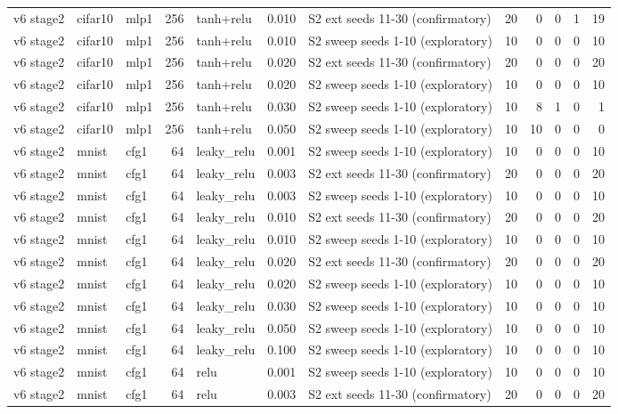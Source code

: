 \begin{table}[htbp]
{\begin{tabular}{@{}lllrlrlrrrrr@{}}
v6 stage2 & cifar10 & mlp1 & 256 & tanh+relu & 0.010 & S2 ext seeds 11-30 (confirmatory) & 20 & 0 & 0 & 1 & 19 \\
v6 stage2 & cifar10 & mlp1 & 256 & tanh+relu & 0.010 & S2 sweep seeds 1-10 (exploratory) & 10 & 0 & 0 & 0 & 10 \\
v6 stage2 & cifar10 & mlp1 & 256 & tanh+relu & 0.020 & S2 ext seeds 11-30 (confirmatory) & 20 & 0 & 0 & 0 & 20 \\
v6 stage2 & cifar10 & mlp1 & 256 & tanh+relu & 0.020 & S2 sweep seeds 1-10 (exploratory) & 10 & 0 & 0 & 0 & 10 \\
v6 stage2 & cifar10 & mlp1 & 256 & tanh+relu & 0.030 & S2 sweep seeds 1-10 (exploratory) & 10 & 8 & 1 & 0 & 1 \\
v6 stage2 & cifar10 & mlp1 & 256 & tanh+relu & 0.050 & S2 sweep seeds 1-10 (exploratory) & 10 & 10 & 0 & 0 & 0 \\
v6 stage2 & mnist & cfg1 & 64 & leaky\_relu & 0.001 & S2 sweep seeds 1-10 (exploratory) & 10 & 0 & 0 & 0 & 10 \\
v6 stage2 & mnist & cfg1 & 64 & leaky\_relu & 0.003 & S2 ext seeds 11-30 (confirmatory) & 20 & 0 & 0 & 0 & 20 \\
v6 stage2 & mnist & cfg1 & 64 & leaky\_relu & 0.003 & S2 sweep seeds 1-10 (exploratory) & 10 & 0 & 0 & 0 & 10 \\
v6 stage2 & mnist & cfg1 & 64 & leaky\_relu & 0.010 & S2 ext seeds 11-30 (confirmatory) & 20 & 0 & 0 & 0 & 20 \\
v6 stage2 & mnist & cfg1 & 64 & leaky\_relu & 0.010 & S2 sweep seeds 1-10 (exploratory) & 10 & 0 & 0 & 0 & 10 \\
v6 stage2 & mnist & cfg1 & 64 & leaky\_relu & 0.020 & S2 ext seeds 11-30 (confirmatory) & 20 & 0 & 0 & 0 & 20 \\
v6 stage2 & mnist & cfg1 & 64 & leaky\_relu & 0.020 & S2 sweep seeds 1-10 (exploratory) & 10 & 0 & 0 & 0 & 10 \\
v6 stage2 & mnist & cfg1 & 64 & leaky\_relu & 0.030 & S2 sweep seeds 1-10 (exploratory) & 10 & 0 & 0 & 0 & 10 \\
v6 stage2 & mnist & cfg1 & 64 & leaky\_relu & 0.050 & S2 sweep seeds 1-10 (exploratory) & 10 & 0 & 0 & 0 & 10 \\
v6 stage2 & mnist & cfg1 & 64 & leaky\_relu & 0.100 & S2 sweep seeds 1-10 (exploratory) & 10 & 0 & 0 & 0 & 10 \\
v6 stage2 & mnist & cfg1 & 64 & relu & 0.001 & S2 sweep seeds 1-10 (exploratory) & 10 & 0 & 0 & 0 & 10 \\
v6 stage2 & mnist & cfg1 & 64 & relu & 0.003 & S2 ext seeds 11-30 (confirmatory) & 20 & 0 & 0 & 0 & 20 \\

\end{tabular}}
\end{table}
